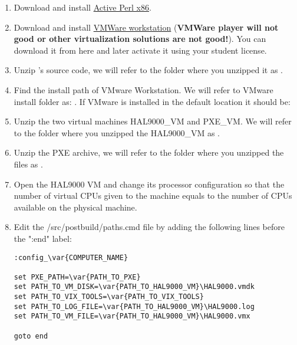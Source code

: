 \begin{appendices}
\begin{enumerate}
	\item Download and install
\href{http://www.activestate.com/activeperl/downloads/thank-you?dl=http://downloads.activestate.com/ActivePerl/releases/5.24.0.2400/ActivePerl-5.24.0.2400-MSWin32-x86-64int-300560.exe}{Active Perl x86}.

	\item Download and install \href{http://www.vmware.com/go/tryworkstation}{VMWare workstation}
(\textbf{VMWare player will not good or other virtualization solutions are not good!}). You can
download it from here and later activate it using your student license.

	\item Unzip \projectname's source code, we will refer to the folder where you unzipped it as
.

	\item Find the install path of VMware Workstation. We will refer to VMware install folder
	as: . If VMware is installed in the default location it should
	be: 

	\item Unzip the two virtual machines HAL9000\_VM and PXE\_VM. We will refer to the folder where
you unzipped the HAL9000\_VM as .

	\item Unzip the PXE archive, we will refer to the folder where you unzipped the files as
.

	\item Open the HAL9000 VM and change its processor configuration so that the number of virtual
CPUs given to the machine equals to the number of CPUs available on the physical machine.

	\item Edit the /src/postbuild/paths.cmd file by adding the
following lines before the ":end" label:

\begin{verbatim}
:config_\var{COMPUTER_NAME}

set PXE_PATH=\var{PATH_TO_PXE}
set PATH_TO_VM_DISK=\var{PATH_TO_HAL9000_VM}\HAL9000.vmdk
set PATH_TO_VIX_TOOLS=\var{PATH_TO_VIX_TOOLS}
set PATH_TO_LOG_FILE=\var{PATH_TO_HAL9000_VM}\HAL9000.log
set PATH_TO_VM_FILE=\var{PATH_TO_HAL9000_VM}\HAL9000.vmx

goto end
\end{verbatim}


\end{enumerate}
\end{appendices}
